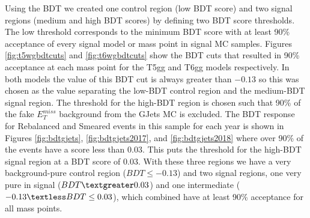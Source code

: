Using the BDT we created one control region (low BDT score) and two signal regions (medium and high BDT scores) by defining two BDT score thresholds.  The low threshold corresponds to the minimum BDT score with at least 90\% acceptance of every signal model or mass point in signal MC samples.  Figures \ref{fig:t5wgbdtcuts} and \ref{fig:t6wgbdtcuts} show the BDT cuts that resulted in 90\% acceptance at each mass point for the T5gg and T6gg models respectively.  In both models the value of this BDT cut is always greater than $-0.13$ so this was chosen as the value separating the low-BDT control region and the medium-BDT signal region.  The threshold for the high-BDT region is chosen such that 90\% of the fake $E^{miss}_T$ background from the GJets MC is excluded.  The BDT response for Rebalanced and Smeared events in this sample for each year is shown in Figures \ref{fig:bdtgjets}, \ref{fig:bdtgjets2017}, and \ref{fig:bdtgjets2018} where over 90\% of the events have a score less than $0.03$.  This puts the threshold for the high-BDT signal region at a BDT score of $0.03$.  With these three regions we have a very background-pure control region ($BDT \leq -0.13$) and two signal regions, one very pure in signal ($BDT\textgreater 0.03$) and one intermediate ($-0.13 \textless BDT \leq 0.03$), which combined have at least 90\% acceptance for all mass points.

